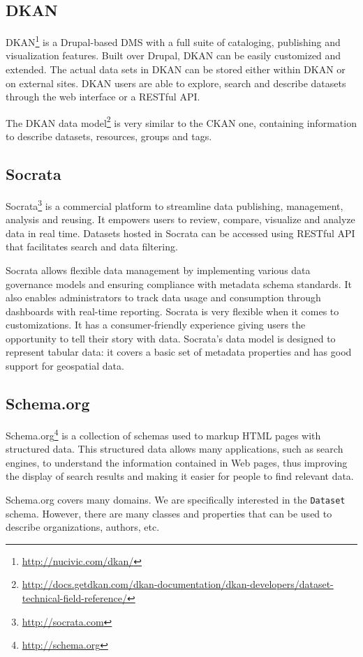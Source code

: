 \subsection{DKAN}
DKAN\footnote{\url{http://nucivic.com/dkan/}} is a Drupal-based DMS with a full suite of cataloging, publishing and visualization features. Built over Drupal, DKAN can be easily customized and extended. The actual data sets in DKAN can be stored either within DKAN or on external sites. DKAN users are able to explore, search and describe datasets through the web interface or a RESTful API.

The DKAN data model\footnote{\url{http://docs.getdkan.com/dkan-documentation/dkan-developers/dataset-technical-field-reference/}} is very similar to the CKAN one, containing information to describe datasets, resources, groups and tags.

\subsection{Socrata}
Socrata\footnote{\url{http://socrata.com}} is a commercial platform to streamline data publishing, management, analysis and reusing. It empowers users to review, compare, visualize and analyze data in real time. Datasets hosted in Socrata can be accessed using RESTful API that facilitates search and data filtering.

Socrata allows flexible data management by implementing various data governance models and ensuring compliance with metadata schema standards. It also enables administrators to track data usage and consumption through dashboards with real-time reporting. Socrata is very flexible when it comes to customizations. It has a consumer-friendly experience giving users the opportunity to tell their story with data. Socrata's data model is designed to represent tabular data: it covers a basic set of metadata properties and has good support for geospatial data.

\subsection{Schema.org}
Schema.org\footnote{\url{http://schema.org}} is a collection of schemas used to markup HTML pages with structured data. This structured data allows many applications, such as search engines, to understand the information contained in Web pages, thus improving the display of search results and making it easier for people to find relevant data.

Schema.org covers many domains. We are specifically interested in the \texttt{Dataset} schema. However, there are many classes and properties that can be used to describe organizations, authors, etc.

